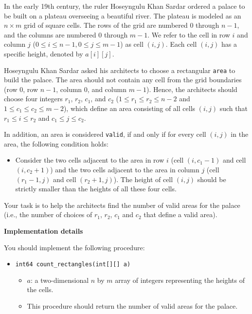 In the early 19th century, the ruler Hoseyngulu Khan Sardar ordered a palace to be built on a plateau overseeing a beautiful river.
The plateau is modeled as an $n \times m$ grid of square cells.
The rows of the grid are numbered $0$ through $n-1$, and the columns are numbered $0$ through $m-1$.
We refer to the cell in row $i$ and column $j$ ($0 \leq i \leq n-1, 0 \leq j \leq m-1$) as cell $(i,j)$.
Each cell $(i,j)$ has a specific height, denoted by $a[i][j]$.

Hoseyngulu Khan Sardar asked his architects to choose a rectangular \texttt{area} to build the palace.
The area should not contain any cell from the grid boundaries (row $0$, row $n-1$, column $0$, and column $m-1$).
Hence, the architects should choose four integers $r_1$, $r_2$, $c_1$, and $c_2$ ($1 \leq r_1 \leq r_2 \leq n-2$ and $1 \leq c_1 \leq c_2 \leq m-2$), which define an area consisting of all cells $(i, j)$ such that $r_1 \leq i \leq r_2$ and $c_1 \leq j \leq c_2$.

In addition, an area is considered \texttt{valid}, if and only if for every cell $(i, j)$ in the area, the following condition holds:

\begin{itemize}
\item Consider the two cells adjacent to the area in row $i$ (cell $(i, c_1-1)$ and cell $(i, c_2+1)$) and the two cells adjacent to the area in column $j$ (cell $(r_1-1, j)$ and cell $(r_2+1, j)$).
The height of cell $(i,j)$ should be strictly smaller than the heights of all these four cells.
\end{itemize}

Your task is to help the architects find the number of valid areas for the palace (i.e., the number of choices of $r_1$, $r_2$, $c_1$ and $c_2$ that define a valid area).

\textbf{Implementation details}

You should implement the following procedure:

\begin{itemize}
\item \texttt{int64 count\_rectangles(int[][] a)}
\begin{itemize}
\item $a$: a two-dimensional $n$ by $m$ array of integers representing the heights of the cells.
\item This procedure should return the number of valid areas for the palace.
\end{itemize}
\end{itemize}


